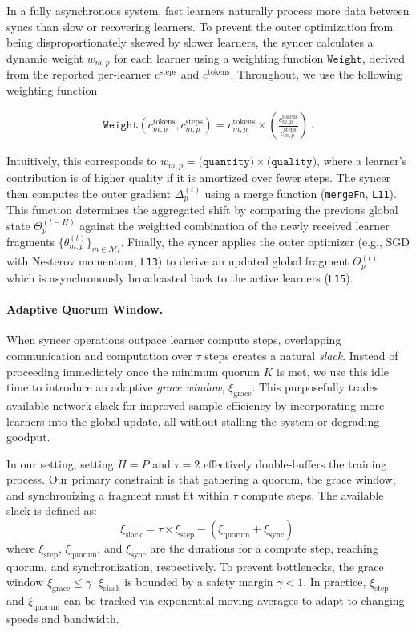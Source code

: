 \documentclass[11pt, a4paper, twocolumn, copyright, google]{google}
\begin{document}
In a fully asynchronous system, fast learners naturally process more data between syncs than slow or recovering learners. To prevent the outer optimization from being disproportionately skewed by slower learners, the syncer calculates a dynamic weight $w_{m,p}$ for each learner using a weighting function $\texttt{Weight}$, derived from the reported per-learner $c^{\text{steps}}$ and $c^{\text{tokens}}$. Throughout, we use the following weighting function

\begin{align*}
    \texttt{Weight}(c^\text{tokens}_{m,p}, c^\text{steps}_{m,p}) = c^\text{tokens}_{m,p} \times \left( \frac{c^\text{tokens}_{m,p}}{c^\text{steps}_{m,p}} \right)\,.
\end{align*}

Intuitively, this corresponds to $w_{m, p}= \texttt{(quantity)} \times \texttt{(quality)}$, where a learner's contribution is of higher quality if it is amortized over fewer steps. The syncer then computes the outer gradient $\Delta_p^{(t)}$ using a merge function (\texttt{mergeFn}, \texttt{L11}). This function determines the aggregated shift by comparing the previous global state $\Theta_p^{(t-H)}$ against the weighted combination of the newly received learner fragments $\{\theta_{m,p}^{(t)}\}_{m \in \mathcal{M}_t}$. Finally, the syncer applies the outer optimizer (e.g., SGD with Nesterov momentum, \texttt{L13}) to derive an updated global fragment $\Theta_p^{(t)}$ which is asynchronously broadcasted back to the active learners (\texttt{L15}).

\paragraph{Adaptive Quorum Window.}\label{sec:adaptive_quorum}

When syncer operations outpace learner compute steps, overlapping communication and computation over $\tau$ steps creates a natural \emph{slack}. Instead of proceeding immediately once the minimum quorum $K$ is met, we use this idle time to introduce an adaptive \emph{grace window}, $\xi_{\text{grace}}$. This purposefully trades available network slack for improved sample efficiency by incorporating more learners into the global update, all without stalling the system or degrading goodput.

In our setting, setting $H=P$ and $\tau=2$ effectively double-buffers the training process. Our primary constraint is that gathering a quorum, the grace window, and synchronizing a fragment must fit within $\tau$ compute steps. The available slack is defined as:
%
\begin{equation}
    \xi_{\text{slack}} = \tau \times \xi_{\text{step}} - (\xi_{\text{quorum}} + \xi_{\text{sync}})\,
\end{equation}
%
where $\xi_{\text{step}}$, $\xi_{\text{quorum}}$, and $\xi_{\text{sync}}$ are the durations for a compute step, reaching quorum, and synchronization, respectively. To prevent bottlenecks, the grace window $ \xi_{\text{grace}} \le \gamma \cdot \xi_{\text{slack}}$ is bounded by a safety margin $\gamma < 1$. In practice, $\xi_{\text{step}}$ and $\xi_{\text{quorum}}$ can be tracked via exponential moving averages to adapt to changing speeds and bandwidth.
\end{document}
